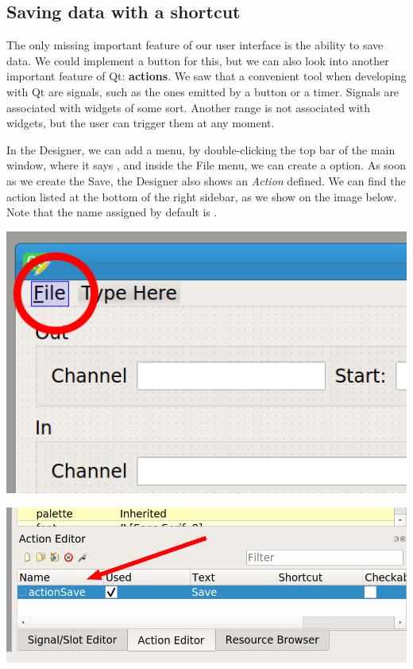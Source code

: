 \subsection{Saving data with a shortcut}\label{subsec:saving-data-with-a-shortcut}
The only missing important feature of our user interface is the ability to save data. We could implement a button for this, but we can also look into another important feature of Qt: \textbf{actions}. We saw that a convenient tool when developing with Qt are signals, such as the ones emitted by a button or a timer. Signals are associated with widgets of some sort. Another range is not associated with widgets, but the user can trigger them at any moment.

In the Designer, we can add a  menu, by double-clicking the top bar of the main window, where it says , and inside the File menu, we can create a  option. As soon as we create the Save, the Designer also shows an \emph{Action} defined. We can find the action listed at the bottom of the right sidebar, as we show on the image below. Note that the name assigned by default is .

\begin{minipage}{0.45\linewidth}
    \centering
    \includegraphics[width=\textwidth]{images/Chapter_09/13_menu_file.png}
\end{minipage}
\hspace{0.5cm}
\begin{minipage}{0.45\linewidth}
    \centering
    \includegraphics[width=\textwidth]{images/Chapter_09/13_action_save.png}
\end{minipage}

